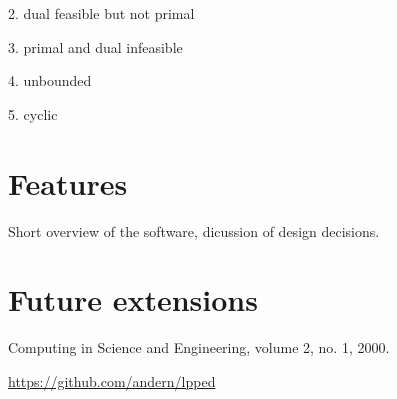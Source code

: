 \documentclass[ukenglish]{nik}
\begin{document}
2. dual feasible but not primal

3. primal and dual infeasible

4. unbounded

5. cyclic

\section{Features}
Short overview of the software, dicussion of design decisions.

\section{Future extensions}





\begin{thebibliography}{99}
 Computing in Science and Engineering, volume 2, no. 1, 2000.

\url{https://github.com/andern/lpped}
\end{thebibliography}
\end{document}
